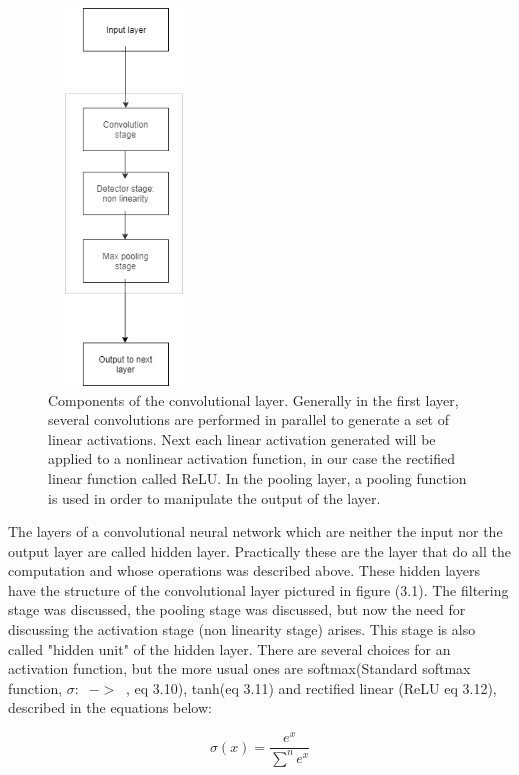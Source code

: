 \documentclass[12pt,a4paper,twoside]{report}
\DeclareMathOperator{\Rrr}{\mathbb{R}^{n}}
\begin{document}
\begin{figure}[h!]
	\centering
	\includegraphics[width=4cm, height=10cm]{img/data/imagecnnlayer.png}
	\caption[]
	{Components of the convolutional layer. Generally in the first layer, several convolutions are performed in parallel to generate a set of linear activations.  Next each linear activation generated will be applied to a nonlinear activation function, in our case the rectified linear function called ReLU. In the pooling layer, a pooling function is used in order to manipulate the output of the layer.}
	\label{fig:imagecnnlayer}
\end{figure}\par

The layers of a convolutional neural network which are neither the input nor the output layer are called hidden layer. Practically these are the layer that do all the computation and whose operations was described above.  These hidden layers have the structure of the convolutional layer pictured in figure (3.1). The filtering stage was discussed, the pooling stage was discussed, but now the need for discussing the activation stage (non linearity stage) arises. This stage is also called "hidden unit" of the hidden layer. There are several choices for an activation function, but the more usual ones are softmax(Standard softmax function, $\sigma:\Rrr->\Rrr$, eq 3.10), tanh(eq 3.11) and rectified linear (ReLU eq 3.12), described in the equations below: 

\begin{equation}
    \sigma(x)=\frac{e^{x}}{\sum^{n} e^{x}}
\end{equation}
\end{document}
